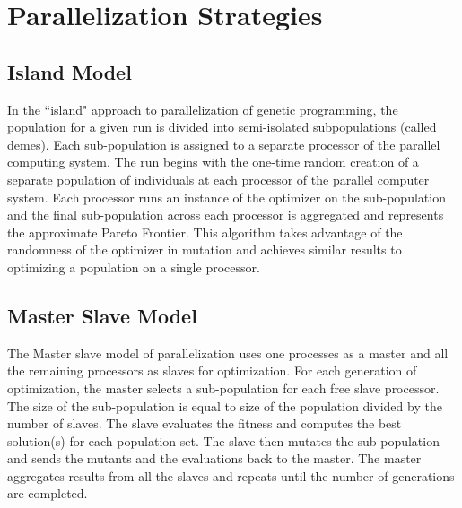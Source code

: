 \documentclass[conference]{IEEEtran}
\begin{document}
	\section{Parallelization Strategies}
	\label{strategies}
	\subsection{Island Model}
	\label{island}
	In the ``island" approach to parallelization of genetic programming\cite{gustafson2006speciating}, the population for a given run is divided into semi-isolated subpopulations (called demes). Each sub-population is assigned to a separate processor of the parallel computing system. The run begins with the one-time random creation of a separate population of individuals at each processor of the parallel computer system. Each processor runs an instance of the optimizer on the sub-population and the final sub-population across each processor is aggregated and represents the approximate Pareto Frontier. This algorithm takes advantage of the randomness of the optimizer in mutation and achieves similar results to optimizing a population on a single processor.
	
	\subsection{Master Slave Model}
	\label{masterSlave}
	The Master slave model of parallelization uses one processes as a master and all the remaining processors as slaves for optimization\cite{rutkowski13Master}. For each generation of optimization, the master selects a sub-population for each free slave processor. The size of the sub-population is  equal to size of the population divided by the number of slaves. The slave evaluates the fitness and computes the best solution(s) for each population set. The slave then mutates the sub-population and sends the mutants and the evaluations back to the master. The master aggregates results from all the slaves and repeats until the number of generations are completed.
	
\end{document}
